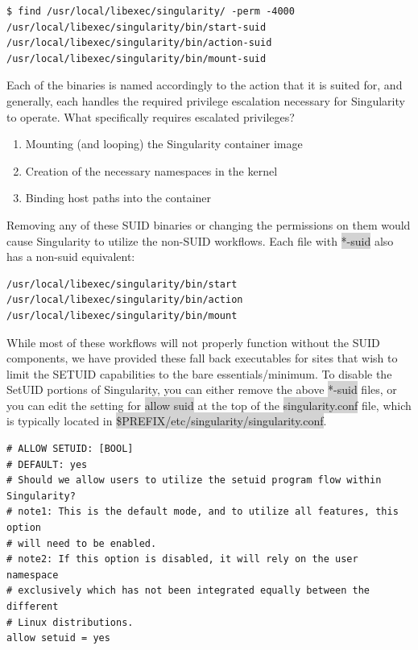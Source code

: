 \documentclass[a4paper]{article}
\begin{document}
\begin{lstlisting}[frame=single]
$ find /usr/local/libexec/singularity/ -perm -4000
/usr/local/libexec/singularity/bin/start-suid
/usr/local/libexec/singularity/bin/action-suid
/usr/local/libexec/singularity/bin/mount-suid
\end{lstlisting}

Each of the binaries is named accordingly to the action that it is suited for, and generally, each handles the required privilege escalation necessary for Singularity to operate. What specifically requires escalated privileges?\\[0.1in]

\begin{enumerate}
\item Mounting (and looping) the Singularity container image
\item Creation of the necessary namespaces in the kernel
\item Binding host paths into the container
\end{enumerate}


Removing any of these SUID binaries or changing the permissions on them would cause Singularity to utilize the non-SUID workflows. Each file with \colorbox{lightgray}{*-suid} also has a non-suid equivalent:

\begin{lstlisting}[frame=single]
/usr/local/libexec/singularity/bin/start
/usr/local/libexec/singularity/bin/action
/usr/local/libexec/singularity/bin/mount
\end{lstlisting}

While most of these workflows will not properly function without the SUID components, we have provided these fall back executables for sites that wish to limit the SETUID capabilities to the bare essentials/minimum. To disable the SetUID portions of Singularity, you can either remove the above \colorbox{lightgray}{*-suid} files, or you can edit the setting for \colorbox{lightgray}{allow suid} at the top of the \colorbox{lightgray}{singularity.conf} file, which is typically located in \colorbox{lightgray}{\$PREFIX/etc/singularity/singularity.conf}.\\[0.1in]

\begin{lstlisting}[frame=single]
# ALLOW SETUID: [BOOL]
# DEFAULT: yes
# Should we allow users to utilize the setuid program flow within Singularity?
# note1: This is the default mode, and to utilize all features, this option
# will need to be enabled.
# note2: If this option is disabled, it will rely on the user namespace
# exclusively which has not been integrated equally between the different
# Linux distributions.
allow setuid = yes
\end{lstlisting}
\end{document}
